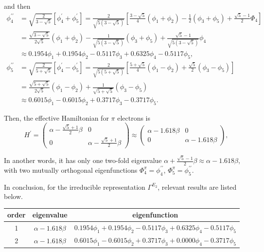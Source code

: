 		and then
		\begin{align*}
			\phi^{\prime\prime}_4 &= \sqrt{ \frac{2}{3-\sqrt{5}} } \left[ \phi^\prime_4 + \phi^\prime_5 \right] = \frac{2}{ \sqrt{5(3-\sqrt{5})} } \left[ \frac{3-\sqrt{5}}{4}(\phi_1 + \phi_2) - \frac{1}{2} (\phi_3 + \phi_5) + \frac{ \sqrt{5}-1 }{2} \Phi_4 \right]\\
			&= \frac{ \sqrt{3-\sqrt{5}} }{2\sqrt{5}}(\phi_1 + \phi_2) - \frac{1}{ \sqrt{ 5(3-\sqrt{5}) } } (\phi_3 + \phi_5) + \frac{ \sqrt{5}-1 }{ \sqrt{ 5(3-\sqrt{5}) } } \phi_4 \\
			&\approx 0.1954 \phi_1 + 0.1954 \phi_2 - 0.5117 \phi_3 +0.6325\phi_4 -0.5117 \phi_5 , \\
			\phi^{\prime\prime}_5 &= \sqrt{ \frac{2}{5+\sqrt{5}} } \left[ \phi^\prime_4 - \phi^\prime_5 \right] = \frac{2}{ \sqrt{5(5+\sqrt{5})} }\left[ \frac{ 5+\sqrt{5} }{4} (\phi_1 - \phi_2) + \frac{ \sqrt{5} }{2} (\phi_3 - \phi_5) \right] \\
			&= \frac{ \sqrt{ 5+\sqrt{5} } }{ 2\sqrt{5} } (\phi_1 - \phi_2) + \frac{ 1 }{ \sqrt{ 5+\sqrt{5} } }(\phi_3 - \phi_5) \\
			&\approx 0.6015 \phi_1 - 0.6015 \phi_2 + 0.3717\phi_3 -0.3717 \phi_5.
		\end{align*}
		
		Then, the effective Hamiltonian for $\pi$ electrons is
		\begin{equation*}
			H^\prime = \begin{pmatrix}
				\alpha - \frac{ \sqrt{5}+1 }{2}\beta & 0 \\
				0 & \alpha - \frac{ \sqrt{5}+1 }{2}\beta
			\end{pmatrix} \approx
			\begin{pmatrix}
				\alpha - 1.618 \beta & 0 \\ 0 & \alpha - 1.618 \beta
			\end{pmatrix}				,
		\end{equation*}
		
		In another words, it has only one two-fold eigenvalue $\alpha + \frac{ \sqrt{5}-1 }{2} \beta\approx \alpha - 1.618 \beta$, with two mutually orthogonal eigenfunctions $\Phi^\pi_4 = \phi^{\prime\prime}_4$, $\Phi^\pi_5 = \phi^{\prime\prime}_5$.
		
		In conclusion, for the irreducible representation $\Gamma^{E_2}$, relevant results are listed below.
		
		\begin{center}
		\setlength{\abovecaptionskip}{0em}
		\begin{tabular}{ccc}\hline
		  order	&	eigenvalue		& 	eigenfunction	\\ \hline
			1	&$\alpha-1.618\beta$& 	$0.1954\phi_1 + 0.1954 \phi_2 -0.5117 \phi_3 +0.6325 \phi_4 -0.5117 \phi_5$ \\
			2	&$\alpha-1.618\beta$& 	$0.6015\phi_1 - 0.6015 \phi_2 +0.3717 \phi_3 +0.0000 \phi_4 -0.3717 \phi_5$ \\	 \hline
		\end{tabular}
		\end{center}
		
